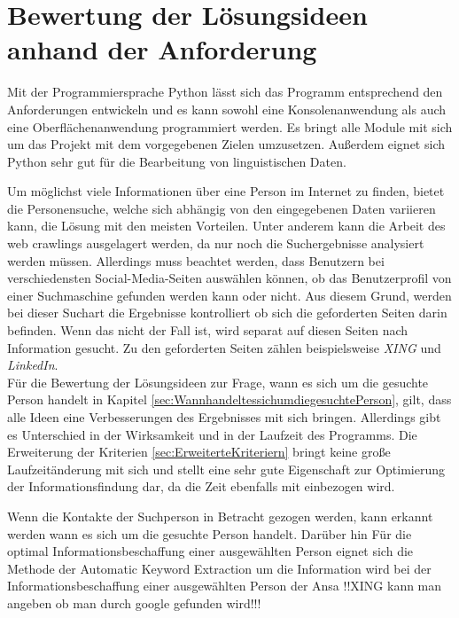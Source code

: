

\chapter{Bewertung der Lösungsideen anhand der Anforderung}  %
\label{cha:Auswahl der Lösung anhand Anforderungen} %
Mit der Programmiersprache Python lässt sich das Programm entsprechend den Anforderungen entwickeln und es kann sowohl eine Konsolenanwendung als auch eine Oberflächenanwendung programmiert werden. Es bringt alle Module mit sich um das Projekt mit dem vorgegebenen Zielen umzusetzen. Außerdem eignet sich Python sehr gut für die Bearbeitung von linguistischen Daten. \cite{bird2009natural}

Um möglichst viele Informationen über eine Person im Internet zu finden, bietet die Personensuche, welche sich abhängig von den eingegebenen Daten variieren kann, die Lösung mit den meisten Vorteilen. Unter anderem kann die Arbeit des web crawlings ausgelagert werden, da nur noch die Suchergebnisse analysiert werden müssen. Allerdings muss beachtet werden, dass Benutzern bei verschiedensten Social-Media-Seiten auswählen können, ob das Benutzerprofil von einer Suchmaschine gefunden werden kann oder nicht. Aus diesem Grund, werden bei dieser Suchart die Ergebnisse kontrolliert ob sich die geforderten Seiten darin befinden. Wenn das nicht der Fall ist, wird separat auf diesen Seiten nach Information gesucht. Zu den geforderten Seiten zählen beispielsweise \textit{XING} und \textit{LinkedIn}.\\
Für die Bewertung der Lösungsideen zur Frage, wann es sich um die gesuchte Person handelt in Kapitel \ref{sec:WannhandeltessichumdiegesuchtePerson}, gilt, dass alle Ideen eine Verbesserungen des Ergebnisses mit sich bringen. Allerdings gibt es Unterschied in der Wirksamkeit und in der Laufzeit des Programms. Die Erweiterung der Kriterien \ref{sec:ErweiterteKriteriern} bringt keine große Laufzeitänderung mit sich und stellt eine sehr gute Eigenschaft zur Optimierung der Informationsfindung dar, da die Zeit ebenfalls mit einbezogen wird.

Wenn die Kontakte der Suchperson in Betracht gezogen werden, kann erkannt werden wann es sich um die gesuchte Person handelt. Darüber hin
Für die optimal Informationsbeschaffung einer ausgewählten Person eignet sich die Methode der Automatic Keyword Extraction um die Information wird bei der Informationsbeschaffung einer ausgewählten Person der Ansa
!!XING kann man angeben ob man durch google gefunden wird!!!

